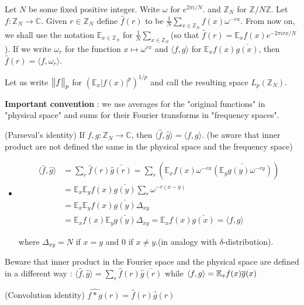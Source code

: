 \documentclass[12pt,a4paper]{report}
\renewcommand{\hat}{\widehat}
\begin{document}
Let $N$ be some fixed positive integer. Write $\omega$ for $e^{2\pi i /N}$. and $\mathbb{Z}_N$ for $\mathbb{Z}/N\mathbb{Z}$. Let $f: \mathbb{Z}_N \rightarrow \mathbb{C}$. Given $r \in \mathbb{Z}_N$ define $\hat{f}(r)$ to be $\frac{1}{N} \sum_{x \in \mathbb{Z}_N} f(x) \omega^{-rx}$. From now on, we shall use the notation $\mathbb{E}_{x\in \mathbb{Z}_N}$ for $\frac{1}{N} \sum_{x \in \mathbb{Z}_N}$(so that $\hat{f}(r)  = \mathbb{E}_x f(x)e^{-2\pi i rx/N}$). If we write $\omega_r$ for the function $x\mapsto \omega^{rx}$ and $\langle f,g \rangle$ for $\mathbb{E}_x f(x)\bar{g(x)}$, then $\hat{f}(r) = \langle f,\omega_r \rangle$.
\s

Let us write $\bigl\lVert f\bigr\rVert_{p}$ for $(\mathbb{E}_x |f(x)|^p)^{1/p}$ and call the resulting space $L_p(\mathbb{Z}_N)$.
\s

\textbf{Important convention} : we use averages for the "original functions" in "physical space" and sums for their Fourier transforms in "frequency spaces".
\s

 (Parseval's identity) If $f,g:\mathbb{Z}_N \rightarrow \mathbb{C}$, then $\langle \hat{f},\hat{g}\rangle =\langle f,g\rangle$. (be aware that inner product are not defined the same in the physical space and the frequency space)
\begin{itemize}
\item[ ] \pf
\begin{align*}
\langle \hat{f},\hat{g} \rangle &= \sum_{r} \hat{f}(r) \bar{\hat{g}(r)} = \sum_r (\mathbb{E}_x f(x)\omega^{-rx} \bar{(\mathbb{E}_y g(y) \omega^{-ry})} ) \\
&= \mathbb{E}_x \mathbb{E}_y f(x)\bar{g(y)} \sum_r \omega^{-r(x-y)} \\
&= \mathbb{E}_x \mathbb{E}_y f(x)\bar{g(y)} \Delta_{xy}\\
&=  \mathbb{E}_x f(x) \mathbb{E}_y \bar{g(y)} \Delta_{xy} = \mathbb{E}_x f(x)\bar{g(x)} = \langle f,g \rangle
\end{align*}

where $\Delta_{xy} = N$ if $x=y$ and $0$ if $x\neq y$.(in analogy with $\delta$-distribution).

\eop
\end{itemize}
\s

Beware that inner product in the Fourier space and the physical space are defined in a different way : $\langle \hat{f},\hat{g} \rangle = \sum_{r} \hat{f}(r) \bar{\hat{g}(r)}$ while $\langle f,g\rangle = \mathbb{E}_x f(x) \overline{g}(x)$
\s

(Convolution identity) $\hat{f * g}(r) = \hat{f}(r) \hat{g}(r)$
\end{document}
